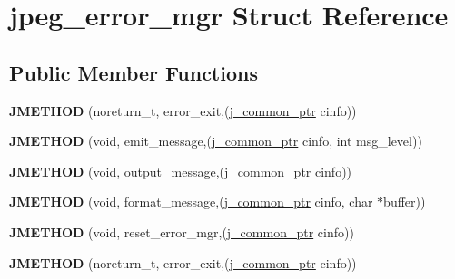 \hypertarget{structjpeg__error__mgr}{\section{jpeg\-\_\-error\-\_\-mgr Struct Reference}
\label{structjpeg__error__mgr}
}
\subsection*{Public Member Functions}
\begin{DoxyCompactItemize}
\item 
\hypertarget{structjpeg__error__mgr_a72c40bceda2e6cb78046165e6892ac3a}{{\bfseries J\-M\-E\-T\-H\-O\-D} (noreturn\-\_\-t, error\-\_\-exit,(\hyperlink{structjpeg__common__struct}{j\-\_\-common\-\_\-ptr} cinfo))}\label{structjpeg__error__mgr_a72c40bceda2e6cb78046165e6892ac3a}

\item 
\hypertarget{structjpeg__error__mgr_a73c0a027b6e6cb8ff2b7b0fc42f756f9}{{\bfseries J\-M\-E\-T\-H\-O\-D} (void, emit\-\_\-message,(\hyperlink{structjpeg__common__struct}{j\-\_\-common\-\_\-ptr} cinfo, int msg\-\_\-level))}\label{structjpeg__error__mgr_a73c0a027b6e6cb8ff2b7b0fc42f756f9}

\item 
\hypertarget{structjpeg__error__mgr_ac2989f8ef34acdd78ce26a9110a1c094}{{\bfseries J\-M\-E\-T\-H\-O\-D} (void, output\-\_\-message,(\hyperlink{structjpeg__common__struct}{j\-\_\-common\-\_\-ptr} cinfo))}\label{structjpeg__error__mgr_ac2989f8ef34acdd78ce26a9110a1c094}

\item 
\hypertarget{structjpeg__error__mgr_a5f1dfb51c337c36ae1bc5fae7f84528f}{{\bfseries J\-M\-E\-T\-H\-O\-D} (void, format\-\_\-message,(\hyperlink{structjpeg__common__struct}{j\-\_\-common\-\_\-ptr} cinfo, char $\ast$buffer))}\label{structjpeg__error__mgr_a5f1dfb51c337c36ae1bc5fae7f84528f}

\item 
\hypertarget{structjpeg__error__mgr_ac676478083167b3731995d7901bd4b6c}{{\bfseries J\-M\-E\-T\-H\-O\-D} (void, reset\-\_\-error\-\_\-mgr,(\hyperlink{structjpeg__common__struct}{j\-\_\-common\-\_\-ptr} cinfo))}\label{structjpeg__error__mgr_ac676478083167b3731995d7901bd4b6c}

\item 
\hypertarget{structjpeg__error__mgr_a72c40bceda2e6cb78046165e6892ac3a}{{\bfseries J\-M\-E\-T\-H\-O\-D} (noreturn\-\_\-t, error\-\_\-exit,(\hyperlink{structjpeg__common__struct}{j\-\_\-common\-\_\-ptr} cinfo))}\label{structjpeg__error__mgr_a72c40bceda2e6cb78046165e6892ac3a}


\end{DoxyCompactItemize}
